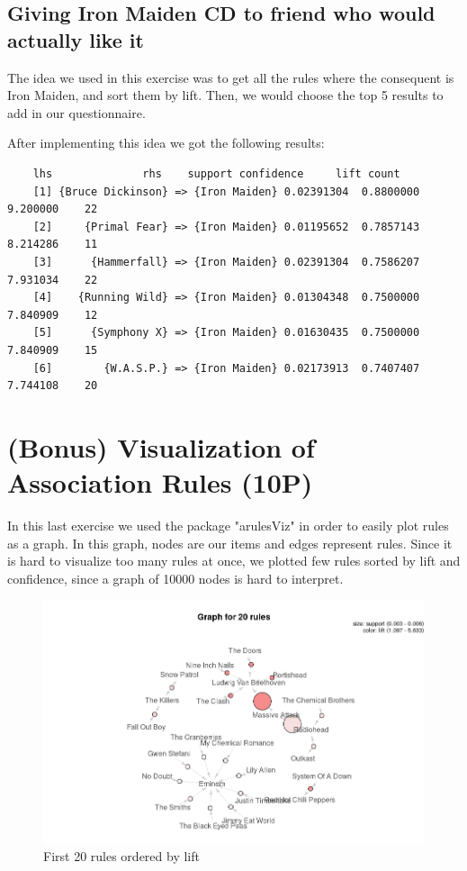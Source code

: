 \documentclass[a4paper]{article}
\begin{document}
	
	\subsection{Giving Iron Maiden CD to friend who would actually like it}
	\par\noindent The idea we used in this exercise was to get all the rules where the consequent is Iron Maiden, and sort them by lift. Then, we would choose the top 5 results to add in our questionnaire.
	\par\noindent After implementing this idea we got the following results:
	\begin{lstlisting}
	lhs              rhs    support confidence     lift count
	[1] {Bruce Dickinson} => {Iron Maiden} 0.02391304  0.8800000 9.200000    22
	[2]     {Primal Fear} => {Iron Maiden} 0.01195652  0.7857143 8.214286    11
	[3]      {Hammerfall} => {Iron Maiden} 0.02391304  0.7586207 7.931034    22
	[4]    {Running Wild} => {Iron Maiden} 0.01304348  0.7500000 7.840909    12
	[5]      {Symphony X} => {Iron Maiden} 0.01630435  0.7500000 7.840909    15
	[6]        {W.A.S.P.} => {Iron Maiden} 0.02173913  0.7407407 7.744108    20
	\end{lstlisting}
	
	
	\section{(Bonus) Visualization of Association Rules (10P)}
	
	In this last exercise we used the package "arulesViz" in order to easily plot rules as a graph. In this graph, nodes are our items and edges represent rules. Since it is hard to visualize too many rules at once, we plotted few rules sorted by lift and confidence, since a graph of 10000 nodes is hard to interpret. 
	
	\pagebreak
	\begin{center}
		\begin{figure}[!ht]
			\includegraphics[width=\textwidth]{images/plot1.png}
			\caption{First 20 rules ordered by lift}
		\end{figure}
	\end{center}
	
\end{document}
